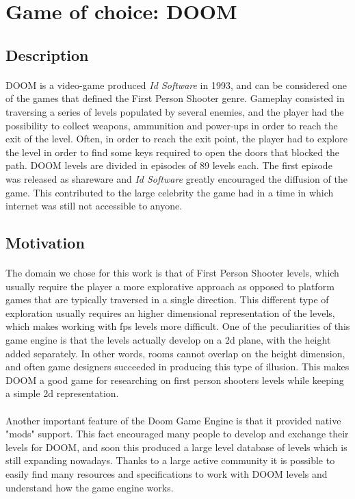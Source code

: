 \section{Game of choice: DOOM}
\label{sec:doominfo}
\subsection{Description}
\paragraph{} DOOM is a video-game produced \textit{Id Software} in 1993, and can be considered one of the games that defined the First Person Shooter genre. Gameplay consisted in traversing a series of levels populated by several enemies, and the player had the possibility to collect weapons, ammunition and power-ups in order to reach the exit of the level. Often, in order to reach the exit point, the player had to explore the level in order to find some keys required to open the doors that blocked the path. DOOM levels are divided in episodes of 8\/9 levels each. The first episode was released as shareware and \textit{Id Software} greatly encouraged the diffusion of the game. This contributed to the large celebrity the game had in a time in which internet was still not accessible to anyone.

\subsection{Motivation}

\paragraph{} The domain we chose for this work is that of First Person Shooter levels, which usually require the player a more explorative approach as opposed to platform games that are typically traversed in a single direction. This different type of exploration usually requires an higher dimensional representation of the levels, which makes working with fps levels more difficult. One of the peculiarities of this game engine is that the levels actually develop on a 2d plane, with the height added separately. In other words, rooms cannot overlap on the height dimension, and often game designers succeeded in producing this type of illusion. This makes DOOM a good game for researching on first person shooters levels while keeping a simple 2d representation. 

\paragraph{} Another important feature of the Doom Game Engine is that it provided native "mods" support. This fact encouraged many people to develop and exchange their levels for DOOM, and soon this produced a large level database of levels which is still expanding nowadays. Thanks to a large active community it is possible to easily find many resources and specifications to work with DOOM levels and understand how the game engine works.

